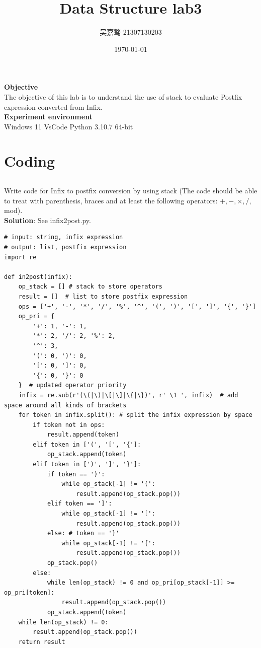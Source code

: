 \documentclass[UTF8]{ctexart}
\title{\textbf{Data Structure lab3}}
\author{吴嘉骜 21307130203}
\date{\today}
\begin{document}
\maketitle

\noindent
\textbf {Objective}\\  The objective of this lab is to understand the use of stack to evaluate Postfix expression converted from Infix. \\
\noindent
\textbf {Experiment environment} \\
    Windows 11 VsCode Python 3.10.7 64-bit

\section{Coding}
\setlength{\parindent}{0pt}
\subsection{}
Write code for Infix to postfix conversion by using stack (The code should
be able to treat with parenthesis, braces and at least the following operators:
$+, -, \times, /,$ mod).\\
\textbf{Solution}: See infix2post.py.
\begin{lstlisting}
# input: string, infix expression
# output: list, postfix expression
import re

def in2post(infix):
    op_stack = [] # stack to store operators
    result = []  # list to store postfix expression
    ops = ['+', '-', '*', '/', '%', '^', '(', ')', '[', ']', '{', '}']
    op_pri = {
        '+': 1, '-': 1, 
        '*': 2, '/': 2, '%': 2, 
        '^': 3, 
        '(': 0, ')': 0, 
        '[': 0, ']': 0, 
        '{': 0, '}': 0
    }  # updated operator priority
    infix = re.sub(r'(\(|\)|\[|\]|\{|\})', r' \1 ', infix)  # add space around all kinds of brackets
    for token in infix.split(): # split the infix expression by space
        if token not in ops:
            result.append(token)
        elif token in ['(', '[', '{']:
            op_stack.append(token)
        elif token in [')', ']', '}']:
            if token == ')':
                while op_stack[-1] != '(':
                    result.append(op_stack.pop())
            elif token == ']':
                while op_stack[-1] != '[':
                    result.append(op_stack.pop())
            else: # token == '}'
                while op_stack[-1] != '{':
                    result.append(op_stack.pop())
            op_stack.pop()
        else:
            while len(op_stack) != 0 and op_pri[op_stack[-1]] >= op_pri[token]:
                result.append(op_stack.pop())
            op_stack.append(token)
    while len(op_stack) != 0:
        result.append(op_stack.pop())
    return result
\end{lstlisting}
\end{document}
